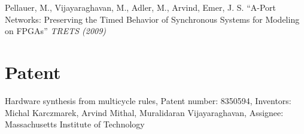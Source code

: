 \documentclass[margin]{resume}
\begin{document}
\begin{resume}
    \vspace{-2mm}
    Pellauer, M., {Vijayaraghavan, M.}, Adler, M., Arvind, Emer, J. S.
    ``A-Port Networks: Preserving the Timed Behavior of Synchronous Systems for
    Modeling on FPGAs'' \textit{TRETS (2009)}

	\section{\mysidestyle Patent}
	Hardware synthesis from multicycle rules, Patent number: 8350594, Inventors: Michal Karczmarek, Arvind Mithal, Muralidaran Vijayaraghavan, Assignee: Massachusetts Institute of Technology


\end{resume}
\end{document}
